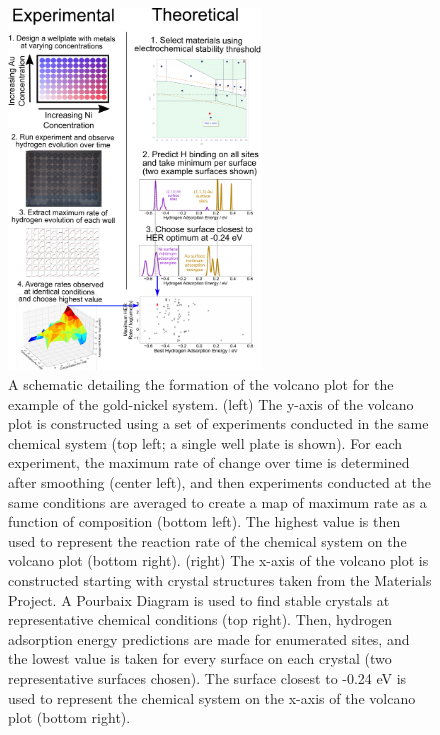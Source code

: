 \documentclass[preprint,12pt]{elsarticle}
\providecommand{\DIFdelbegin}{} %
\providecommand{\DIFaddbeginFL}{} %
\providecommand{\DIFaddendFL}{} %
\providecommand{\DIFdelendFL}{} %
\newcommand{\DIFscaledelfig}{0.5}
\newlength{\DIFdelgraphicswidth} %
\newlength{\DIFdelgraphicsheight} %
\newcommand{\DIFaddincludegraphics}[2][]{{\color{blue}\fbox{\DIFOincludegraphics[#1]{#2}}}} %
\newcommand{\DIFdelincludegraphics}[2][]{%
\sbox{\DIFdelgraphicsbox}{\DIFOincludegraphics[#1]{#2}}%
\settoboxwidth{\DIFdelgraphicswidth}{\DIFdelgraphicsbox} %
\settoboxtotalheight{\DIFdelgraphicsheight}{\DIFdelgraphicsbox} %
\scalebox{\DIFscaledelfig}{%
\parbox[b]{\DIFdelgraphicswidth}{\usebox{\DIFdelgraphicsbox}\\[-\baselineskip] \rule{\DIFdelgraphicswidth}{0em}}\llap{\resizebox{\DIFdelgraphicswidth}{\DIFdelgraphicsheight}{%
\setlength{\unitlength}{\DIFdelgraphicswidth}%
\begin{picture}(1,1)%
\thicklines\linethickness{2pt} %
{\color[rgb]{1,0,0}\put(0,0){\framebox(1,1){}}}%
{\color[rgb]{1,0,0}\put(0,0){\line( 1,1){1}}}%
{\color[rgb]{1,0,0}\put(0,1){\line(1,-1){1}}}%
\end{picture}%
}\hspace*{3pt}}} %
} %
\DeclareRobustCommand{\DIFdelbegin}{\DIFOdelbegin \let\includegraphics\DIFdelincludegraphics} %
\DeclareRobustCommand{\DIFaddbeginFL}{\DIFOaddbeginFL \let\includegraphics\DIFaddincludegraphics} %
\DeclareRobustCommand{\DIFaddendFL}{\DIFOaddendFL \let\includegraphics\DIFOincludegraphics} %
\DeclareRobustCommand{\DIFdelendFL}{\DIFOaddendFL \let\includegraphics\DIFOincludegraphics} %
\begin{document}
\DIFdelbegin %
\DIFdelendFL \DIFaddbeginFL \begin{figure}[h!]
\DIFaddendFL \centering
    \includegraphics[width=0.6\textwidth]{figures/fig_3.pdf}
\caption{A schematic detailing the formation of the volcano plot for the example of the gold-nickel system. (left) The y-axis of the volcano plot is constructed using a set of experiments conducted in the same chemical system (top left; a single well plate is shown). For each experiment, the maximum rate of change over time is determined after smoothing (center left), and then experiments conducted at the same conditions are averaged to create a map of maximum rate as a function of composition (bottom left). The highest value is then used to represent the reaction rate of the chemical system on the volcano plot (bottom right). (right) The x-axis of the volcano plot is constructed starting with crystal structures taken from the Materials Project. A Pourbaix Diagram is used to find stable crystals at representative chemical conditions (top right). Then, hydrogen adsorption energy predictions are made for enumerated sites, and the lowest value is taken for every surface on each crystal (two representative surfaces chosen). The surface closest to -0.24 eV is used to represent the chemical system on the x-axis of the volcano plot (bottom right).
}
\DIFaddbeginFL \label{figure_3}
\DIFaddendFL \end{figure}
\end{document}
